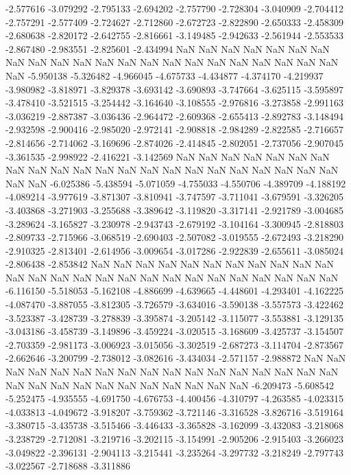-2.577616
-3.079292
-2.795133
-2.694202
-2.757790
-2.728304
-3.040909
-2.704412
-2.757291
-2.577409
-2.724627
-2.712860
-2.672723
-2.822890
-2.650333
-2.458309
-2.680638
-2.820172
-2.642755
-2.816661
-3.149485
-2.942633
-2.561944
-2.553533
-2.867480
-2.983551
-2.825601
-2.434994
NaN
NaN
NaN
NaN
NaN
NaN
NaN
NaN
NaN
NaN
NaN
NaN
NaN
NaN
NaN
NaN
NaN
NaN
NaN
NaN
NaN
NaN
NaN
-5.950138
-5.326482
-4.966045
-4.675733
-4.434877
-4.374170
-4.219937
-3.980982
-3.818971
-3.829378
-3.693142
-3.690893
-3.747664
-3.625115
-3.595897
-3.478410
-3.521515
-3.254442
-3.164640
-3.108555
-2.976816
-3.273858
-2.991163
-3.036219
-2.887387
-3.036436
-2.964472
-2.609368
-2.655413
-2.892783
-3.148494
-2.932598
-2.900416
-2.985020
-2.972141
-2.908818
-2.984289
-2.822585
-2.716657
-2.814656
-2.714062
-3.169696
-2.874026
-2.414845
-2.802051
-2.737056
-2.907045
-3.361535
-2.998922
-2.416221
-3.142569
NaN
NaN
NaN
NaN
NaN
NaN
NaN
NaN
NaN
NaN
NaN
NaN
NaN
NaN
NaN
NaN
NaN
NaN
NaN
NaN
NaN
NaN
NaN
NaN
-6.025386
-5.438594
-5.071059
-4.755033
-4.550706
-4.389709
-4.188192
-4.089214
-3.977619
-3.871307
-3.810941
-3.747597
-3.711041
-3.679591
-3.326205
-3.403868
-3.271903
-3.255688
-3.389642
-3.119820
-3.317141
-2.921789
-3.004685
-3.289624
-3.165827
-3.230978
-2.943743
-2.679192
-3.104164
-3.300945
-2.818803
-2.809733
-2.715966
-3.068519
-2.690403
-2.507082
-3.019555
-2.672493
-3.218290
-2.910325
-2.813401
-2.614956
-3.009654
-3.017286
-2.922839
-2.655611
-3.085024
-2.806438
-2.853842
NaN
NaN
NaN
NaN
NaN
NaN
NaN
NaN
NaN
NaN
NaN
NaN
NaN
NaN
NaN
NaN
NaN
NaN
NaN
NaN
NaN
NaN
NaN
NaN
NaN
NaN
-6.116150
-5.518053
-5.162108
-4.886699
-4.639665
-4.448601
-4.293401
-4.162225
-4.087470
-3.887055
-3.812305
-3.726579
-3.634016
-3.590138
-3.557573
-3.422462
-3.523387
-3.428739
-3.278839
-3.395874
-3.205142
-3.115077
-3.553881
-3.129135
-3.043186
-3.458739
-3.149896
-3.459224
-3.020515
-3.168609
-3.425737
-3.154507
-2.703359
-2.981173
-3.006923
-3.015056
-3.302519
-2.687273
-3.114704
-2.873567
-2.662646
-3.200799
-2.738012
-3.082616
-3.434034
-2.571157
-2.988872
NaN
NaN
NaN
NaN
NaN
NaN
NaN
NaN
NaN
NaN
NaN
NaN
NaN
NaN
NaN
NaN
NaN
NaN
NaN
NaN
NaN
NaN
NaN
NaN
NaN
NaN
NaN
NaN
-6.209473
-5.608542
-5.252475
-4.935555
-4.691750
-4.676753
-4.400456
-4.310797
-4.263585
-4.023315
-4.033813
-4.049672
-3.918207
-3.759362
-3.721146
-3.316528
-3.826716
-3.519164
-3.380715
-3.435738
-3.515466
-3.446433
-3.365828
-3.162099
-3.432083
-3.218068
-3.238729
-2.712081
-3.219716
-3.202115
-3.154991
-2.905206
-2.915403
-3.266023
-3.049822
-2.396131
-2.904113
-3.215441
-3.235264
-3.297732
-3.218249
-2.797743
-3.022567
-2.718688
-3.311886

